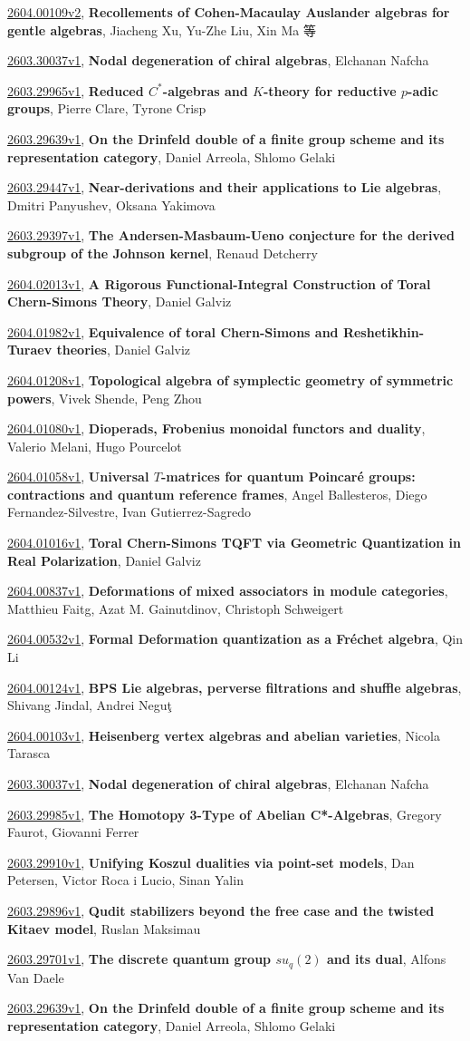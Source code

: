 \documentclass[9pt, a4paper]{article}
\theoremstyle{plain}
\theoremstyle{definition}
\theoremstyle{remark}
\newcommand{\arxiv}[3]{\href{https://arxiv.org/abs/#1}{#1}, \textbf{\textcolor{arxivblue}{#2}}, #3}
\begin{document}
\arxiv{2604.00109v2}{Recollements of Cohen-Macaulay Auslander algebras for gentle algebras}{Jiacheng Xu, Yu-Zhe Liu, Xin Ma 等}

\arxiv{2603.30037v1}{Nodal degeneration of chiral algebras}{Elchanan Nafcha}

\arxiv{2603.29965v1}{Reduced $C^*$-algebras and $K$-theory for reductive $p$-adic groups}{Pierre Clare, Tyrone Crisp}

\arxiv{2603.29639v1}{On the Drinfeld double of a finite group scheme and its representation category}{Daniel Arreola, Shlomo Gelaki}

\arxiv{2603.29447v1}{Near-derivations and their applications to Lie algebras}{Dmitri Panyushev, Oksana Yakimova}

\arxiv{2603.29397v1}{The Andersen-Masbaum-Ueno conjecture for the derived subgroup of the Johnson kernel}{Renaud Detcherry}

\arxiv{2604.02013v1}{A Rigorous Functional-Integral Construction of Toral Chern-Simons Theory}{Daniel Galviz}

\arxiv{2604.01982v1}{Equivalence of toral Chern-Simons and Reshetikhin-Turaev theories}{Daniel Galviz}

\arxiv{2604.01208v1}{Topological algebra of symplectic geometry of symmetric powers}{Vivek Shende, Peng Zhou}

\arxiv{2604.01080v1}{Dioperads, Frobenius monoidal functors and duality}{Valerio Melani, Hugo Pourcelot}

\arxiv{2604.01058v1}{Universal $T$-matrices for quantum Poincaré groups: contractions and quantum reference frames}{Angel Ballesteros, Diego Fernandez-Silvestre, Ivan Gutierrez-Sagredo}

\arxiv{2604.01016v1}{Toral Chern-Simons TQFT via Geometric Quantization in Real Polarization}{Daniel Galviz}

\arxiv{2604.00837v1}{Deformations of mixed associators in module categories}{Matthieu Faitg, Azat M. Gainutdinov, Christoph Schweigert}

\arxiv{2604.00532v1}{Formal Deformation quantization as a Fréchet algebra}{Qin Li}

\arxiv{2604.00124v1}{BPS Lie algebras, perverse filtrations and shuffle algebras}{Shivang Jindal, Andrei Neguţ}

\arxiv{2604.00103v1}{Heisenberg vertex algebras and abelian varieties}{Nicola Tarasca}

\arxiv{2603.30037v1}{Nodal degeneration of chiral algebras}{Elchanan Nafcha}

\arxiv{2603.29985v1}{The Homotopy 3-Type of Abelian C*-Algebras}{Gregory Faurot, Giovanni Ferrer}

\arxiv{2603.29910v1}{Unifying Koszul dualities via point-set models}{Dan Petersen, Victor Roca i Lucio, Sinan Yalin}

\arxiv{2603.29896v1}{Qudit stabilizers beyond the free case and the twisted Kitaev model}{Ruslan Maksimau}

\arxiv{2603.29701v1}{The discrete quantum group $su_q(2)$ and its dual}{Alfons Van Daele}

\arxiv{2603.29639v1}{On the Drinfeld double of a finite group scheme and its representation category}{Daniel Arreola, Shlomo Gelaki}

\end{document}
